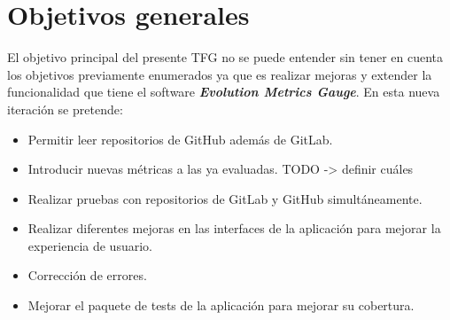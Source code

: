 \newpage

\section{Objetivos generales}
El objetivo principal del presente TFG no se puede entender sin tener en cuenta los objetivos previamente enumerados ya que es realizar mejoras y extender la funcionalidad que tiene el software \textit{\textbf{Evolution Metrics Gauge}}.
En esta nueva iteración se pretende:

\begin{itemize}
	\tightlist
	\item Permitir leer repositorios de GitHub además de GitLab.
	\item Introducir nuevas métricas a las ya evaluadas. TODO -> definir cuáles
	\item Realizar pruebas con repositorios de GitLab y GitHub simultáneamente.
	\item Realizar diferentes mejoras en las interfaces de la aplicación para mejorar la experiencia de usuario.
	\item Corrección de errores.
	\item Mejorar el paquete de tests de la aplicación para mejorar su cobertura.
\end{itemize}

\newpage


